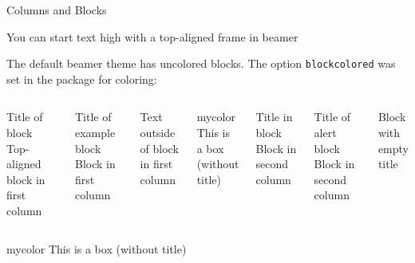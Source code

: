 \documentclass[aspectratio=169,smaller]{beamer}
\begin{document}
\begin{frame}[t]{Columns and Blocks}

You can start text high with a top-aligned frame in beamer

 The default beamer theme has uncolored blocks. The option \texttt{blockcolored} was set in the package for coloring: 
  \begin{columns}
      \begin{block}{Title of block}
        Top-aligned block in first column
      \end{block}
      \begin{exampleblock}{Title of example block}
        Block in first column
      \end{exampleblock}
      Text outside of block in first column
      \vspace{1ex}
      
      \begin{beamercolorbox}[wd=\linewidth, colsep*=4pt]{mycolor}
         This is a box (without title)
       \end{beamercolorbox}
      \begin{block}{Title in block}
        Block in second column 
      \end{block}
      \begin{alertblock}{Title of alert block}
        Block in second column
      \end{alertblock}
      \begin{block}{}
        Block with empty title
      \end{block}
    \end{columns}
    
    \vspace{1ex}
    \begin{beamercolorbox}[wd=\linewidth, colsep*=4pt]{mycolor}
      This is a box (without title)
    \end{beamercolorbox}
 \end{frame}
 
\end{document}
